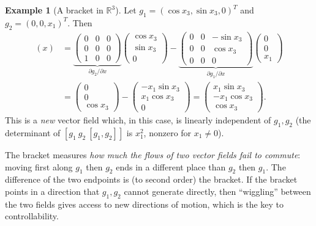 \documentclass[11pt,a4paper]{article}
\newcommand{\R}{\mathbb{R}}
\newcommand{\LB}[2]{[#1,#2]}
\theoremstyle{definition}
\newtheorem{example}[definition]{Example}
\theoremstyle{plain}
\theoremstyle{remark}
\begin{document}
\begin{example}[A bracket in $\R^3$]
\label{ex:lb3}
Let $g_1=(\cos x_3,\sin x_3,0)^T$ and $g_2=(0,0,x_1)^T$. Then
\begin{align*}
\LB{g_1}{g_2}(x)&=
\underbrace{\begin{pmatrix}0&0&0\\0&0&0\\1&0&0\end{pmatrix}}_{\partial g_2/\partial x}\begin{pmatrix}\cos x_3\\\sin x_3\\0\end{pmatrix}
-\underbrace{\begin{pmatrix}0&0&-\sin x_3\\0&0&\cos x_3\\0&0&0\end{pmatrix}}_{\partial g_1/\partial x}\begin{pmatrix}0\\0\\x_1\end{pmatrix}\\
&=\begin{pmatrix}0\\0\\\cos x_3\end{pmatrix}-\begin{pmatrix}-x_1\sin x_3\\x_1\cos x_3\\0\end{pmatrix}
=\begin{pmatrix}x_1\sin x_3\\-x_1\cos x_3\\\cos x_3\end{pmatrix}.
\end{align*}
This is a \emph{new} vector field which, in this case, is linearly independent of $g_1,g_2$ (the determinant of $[g_1\ g_2\ \LB{g_1}{g_2}]$ is $x_1^2$, nonzero for $x_1\neq0$).
\end{example}

\begin{intuition}
The bracket measures \emph{how much the flows of two vector fields fail to commute}: moving first along $g_1$ then $g_2$ ends in a different place than $g_2$ then $g_1$. The difference of the two endpoints is (to second order) the bracket. If the bracket points in a direction that $g_1,g_2$ cannot generate directly, then ``wiggling'' between the two fields gives access to new directions of motion, which is the key to controllability.
\end{intuition}
\end{document}
